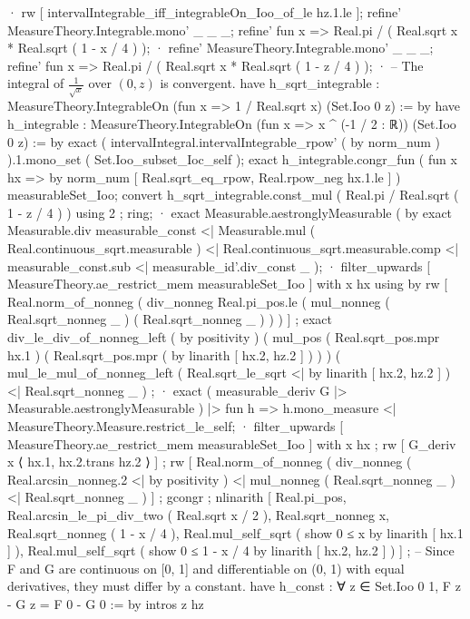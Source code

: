       · rw [ intervalIntegrable_iff_integrableOn_Ioo_of_le hz.1.le ];
        refine' MeasureTheory.Integrable.mono' _ _ _;
        refine' fun x => Real.pi / ( Real.sqrt x * Real.sqrt ( 1 - x / 4 ) );
        · refine' MeasureTheory.Integrable.mono' _ _ _;
          refine' fun x => Real.pi / ( Real.sqrt x * Real.sqrt ( 1 - z / 4 ) );
          · -- The integral of $\frac{1}{\sqrt{x}}$ over $(0, z)$ is convergent.
            have h_sqrt_integrable : MeasureTheory.IntegrableOn (fun x => 1 / Real.sqrt x) (Set.Ioo 0 z) := by
              have h_integrable : MeasureTheory.IntegrableOn (fun x => x ^ (-1 / 2 : ℝ)) (Set.Ioo 0 z) := by
                exact ( intervalIntegral.intervalIntegrable_rpow' ( by norm_num ) ).1.mono_set ( Set.Ioo_subset_Ioc_self );
              exact h_integrable.congr_fun ( fun x hx => by norm_num [ Real.sqrt_eq_rpow, Real.rpow_neg hx.1.le ] ) measurableSet_Ioo;
            convert h_sqrt_integrable.const_mul ( Real.pi / Real.sqrt ( 1 - z / 4 ) ) using 2 ; ring;
          · exact Measurable.aestronglyMeasurable ( by exact Measurable.div measurable_const <| Measurable.mul ( Real.continuous_sqrt.measurable ) <| Real.continuous_sqrt.measurable.comp <| measurable_const.sub <| measurable_id'.div_const _ );
          · filter_upwards [ MeasureTheory.ae_restrict_mem measurableSet_Ioo ] with x hx using by rw [ Real.norm_of_nonneg ( div_nonneg Real.pi_pos.le ( mul_nonneg ( Real.sqrt_nonneg _ ) ( Real.sqrt_nonneg _ ) ) ) ] ; exact div_le_div_of_nonneg_left ( by positivity ) ( mul_pos ( Real.sqrt_pos.mpr hx.1 ) ( Real.sqrt_pos.mpr ( by linarith [ hx.2, hz.2 ] ) ) ) ( mul_le_mul_of_nonneg_left ( Real.sqrt_le_sqrt <| by linarith [ hx.2, hz.2 ] ) <| Real.sqrt_nonneg _ ) ;
        · exact ( measurable_deriv G |> Measurable.aestronglyMeasurable ) |> fun h => h.mono_measure <| MeasureTheory.Measure.restrict_le_self;
        · filter_upwards [ MeasureTheory.ae_restrict_mem measurableSet_Ioo ] with x hx ; rw [ G_deriv x ⟨ hx.1, hx.2.trans hz.2 ⟩ ] ; rw [ Real.norm_of_nonneg ( div_nonneg ( Real.arcsin_nonneg.2 <| by positivity ) <| mul_nonneg ( Real.sqrt_nonneg _ ) <| Real.sqrt_nonneg _ ) ] ; gcongr ; nlinarith [ Real.pi_pos, Real.arcsin_le_pi_div_two ( Real.sqrt x / 2 ), Real.sqrt_nonneg x, Real.sqrt_nonneg ( 1 - x / 4 ), Real.mul_self_sqrt ( show 0 ≤ x by linarith [ hx.1 ] ), Real.mul_self_sqrt ( show 0 ≤ 1 - x / 4 by linarith [ hx.2, hz.2 ] ) ] ;
  -- Since F and G are continuous on [0, 1] and differentiable on (0, 1) with equal derivatives, they must differ by a constant.
  have h_const : ∀ z ∈ Set.Ioo 0 1, F z - G z = F 0 - G 0 := by
    intros z hz
